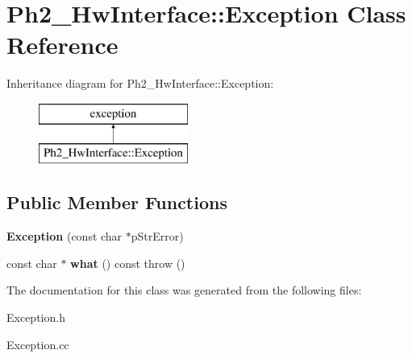 \hypertarget{class_ph2___hw_interface_1_1_exception}{\section{Ph2\-\_\-\-Hw\-Interface\-:\-:Exception Class Reference}
\label{class_ph2___hw_interface_1_1_exception}
}
Inheritance diagram for Ph2\-\_\-\-Hw\-Interface\-:\-:Exception\-:\begin{figure}[H]
\begin{center}
\leavevmode
\includegraphics[height=2.000000cm]{class_ph2___hw_interface_1_1_exception}
\end{center}
\end{figure}
\subsection*{Public Member Functions}
\begin{DoxyCompactItemize}
\item 
\hypertarget{class_ph2___hw_interface_1_1_exception_a9ac7df51fe36dfb65ff24ca975ec846f}{{\bfseries Exception} (const char $\ast$p\-Str\-Error)}\label{class_ph2___hw_interface_1_1_exception_a9ac7df51fe36dfb65ff24ca975ec846f}

\item 
\hypertarget{class_ph2___hw_interface_1_1_exception_a8db77fef785111589956a21598b748e0}{const char $\ast$ {\bfseries what} () const   throw ()}\label{class_ph2___hw_interface_1_1_exception_a8db77fef785111589956a21598b748e0}

\end{DoxyCompactItemize}


The documentation for this class was generated from the following files\-:\begin{DoxyCompactItemize}
\item 
Exception.\-h\item 
Exception.\-cc\end{DoxyCompactItemize}
